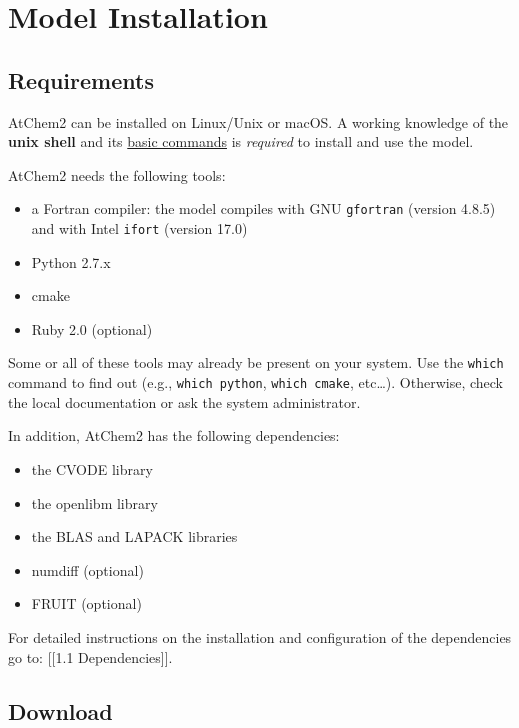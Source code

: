 \chapter{Model Installation} \label{ch:installation}

\section{Requirements} \label{sec:requirements}

AtChem2 can be installed on Linux/Unix or macOS. A working knowledge of
the \textbf{unix shell} and its
\href{https://swcarpentry.github.io/shell-novice/reference/}{basic
commands} is \emph{required} to install and use the model.

AtChem2 needs the following tools:

\begin{itemize}
\item
  a Fortran compiler: the model compiles with GNU \texttt{gfortran}
  (version 4.8.5) and with Intel \texttt{ifort} (version 17.0)
\item
  Python 2.7.x
\item
  cmake
\item
  Ruby 2.0 (optional)
\end{itemize}

Some or all of these tools may already be present on your system. Use
the \texttt{which} command to find out (e.g., \texttt{which\ python},
\texttt{which\ cmake}, etc\ldots{}). Otherwise, check the local
documentation or ask the system administrator.

In addition, AtChem2 has the following dependencies:

\begin{itemize}
\item
  the CVODE library
\item
  the openlibm library
\item
  the BLAS and LAPACK libraries
\item
  numdiff (optional)
\item
  FRUIT (optional)
\end{itemize}

For detailed instructions on the installation and configuration of the
dependencies go to: {[}{[}1.1 Dependencies{]}{]}.

\section{Download} \label{sec:download}

